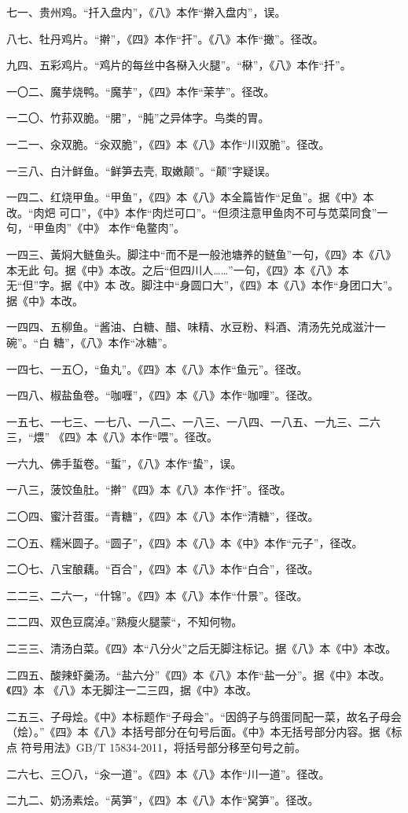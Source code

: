 七一、贵州鸡。“扦入盘内”，《八》本作“擀入盘内”，误。

八七、牡丹鸡片。“擀”，《四》本作“扞”。《八》本作“撖”。径改。

九四、五彩鸡片。“鸡片的每丝中各㮟入火腿”。“㮟”，《八》本作“扦”。

一〇二、魔芋烧鸭。“魔芋”，《四》本作“茉芋”。径改。

一二〇、竹荪双脆。“𬂁”，“肫”之异体字。鸟类的胃。

一二一、汆双脆。“汆双脆”，《四》本《八》本作“川双脆”。径改。

一三八、白汁鲜鱼。“鲜笋去壳, 取嫩颠”。“颠”字疑误。

一四二、红烧甲鱼。“甲鱼”，《四》本《八》本全篇皆作“足鱼”。据《中》本改。“肉𤆵
可口”，《中》本作“肉烂可口”。“但须注意甲鱼肉不可与苋菜同食”一句，“甲鱼肉”《中》
本作“龟鳖肉”。

一四三、黃焖大鲢鱼头。脚注中“而不是一般池塘养的鲢鱼”一句，《四》本《八》本无此
句。据《中》本改。之后“但四川人……”一句，《四》本《八》本无“但”字。据《中》本
改。脚注中“身圆口大”，《四》本《八》本作“身团口大”。据《中》本改。

一四四、五柳鱼。“酱油、白糖、醋、味精、水豆粉、料酒、清汤先兑成滋汁一碗”。“白
糖”，《八》本作“冰糖”。

一四七、一五〇，“鱼丸”。《四》本《八》本作“鱼元”。径改。

一四八、椒盐鱼卷。“咖喱”，《四》本《八》本作“咖哩”。径改。

一五七、一七三、一七八、一八二、一八三、一八四、一八五、一九三、二六三，“煨”
《四》本《八》本作“喂”。径改。

一六九、佛手蜇卷。“蜇”，《八》本作“蛰”，误。

一八三，菠饺鱼肚。“擀”《四》本《八》本作“扞”。径改。

二〇四、蜜汁苕蛋。“青糖”，《四》本《八》本作“清糖”，径改。

二〇五、糯米圆子。“圆子”，《四》本《八》本《中》本作“元子”，径改。

二〇七、八宝酿藕。“百合”，《四》本《八》本作“白合”，径改。

二二三、二六一，“什锦”。《四》本《八》本作“什景”。径改。

二二四、双色豆腐淖。”熟瘦火腿蒙“，不知何物。

二三三、清汤白菜。《四》本“八分火”之后无脚注标记。据《八》本《中》本改。

二四五、酸辣虾羹汤。“盐六分”《四》本《八》本作“盐一分”。据《中》本改。《四》本
《八》本无脚注一二三四，据《中》本改。

二五三、子母烩。《中》本标题作“子母会”。“因鸽子与鸽蛋同配一菜，故名子母会
（烩）。”《四》本《八》本括号部分在句号后面。《中》本无括号部分内容。据《标点
符号用法》GB/T 15834-2011，将括号部分移至句号之前。

二六七、三〇八，“汆一道”。《四》本《八》本作“川一道”。径改。

二九二、奶汤素烩。“莴笋”，《四》本《八》本作“窝笋”。径改。

